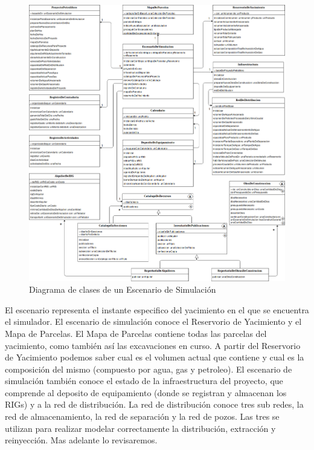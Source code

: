 \documentclass[10pt,a4paper]{article}
\begin{document}
\begin{figure}[H]
\centerline{\includegraphics[scale=0.42]{images/DiagramaDeClases_deEscenario.png}}
\caption{Diagrama de clases de un Escenario de Simulación}
\end{figure}

El escenario representa el instante especifico del yacimiento en el que se encuentra el simulador. El escenario de simulación conoce el Reservorio de Yacimiento y el Mapa de Parcelas. 
El Mapa de Parcelas contiene todas las parcelas del yacimiento, como también así las excavaciones en curso.
A partir del Reservorio de Yacimiento podemos saber cual es el volumen actual que contiene y cual es la composición del mismo (compuesto por agua, gas y petroleo). El escenario de simulación también conoce el estado de la infraestructura del proyecto, que comprende al deposito de equipamiento (donde se registran y almacenan los RIGs) y a la red de distribución. La red de distribución conoce tres sub redes, la red de almacenamiento, la red de separación y la red de pozos. Las tres se utilizan para realizar modelar correctamente la distribución, extracción y reinyección. Mas adelante lo revisaremos.
\end{document}
